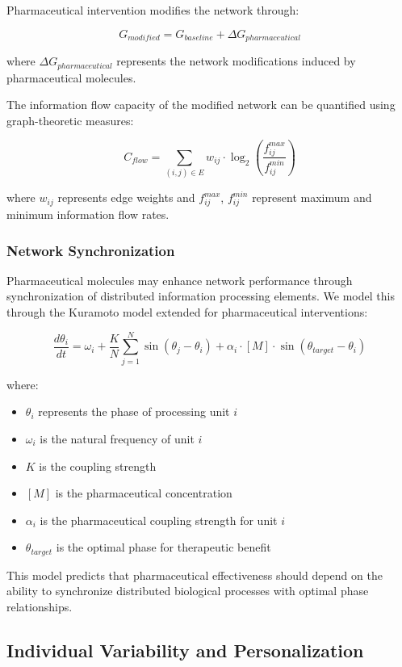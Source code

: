 \documentclass[12pt,a4paper]{article}
\begin{document}
Pharmaceutical intervention modifies the network through:

$$G_{modified} = G_{baseline} + \Delta G_{pharmaceutical}$$

where $\Delta G_{pharmaceutical}$ represents the network modifications induced by pharmaceutical molecules.

The information flow capacity of the modified network can be quantified using graph-theoretic measures:

$$C_{flow} = \sum_{(i,j) \in E} w_{ij} \cdot \log_2\left(\frac{f_{ij}^{max}}{f_{ij}^{min}}\right)$$

where $w_{ij}$ represents edge weights and $f_{ij}^{max}$, $f_{ij}^{min}$ represent maximum and minimum information flow rates.

\subsubsection{Network Synchronization}

Pharmaceutical molecules may enhance network performance through synchronization of distributed information processing elements. We model this through the Kuramoto model extended for pharmaceutical interventions:

$$\frac{d\theta_i}{dt} = \omega_i + \frac{K}{N} \sum_{j=1}^{N} \sin(\theta_j - \theta_i) + \alpha_i \cdot [M] \cdot \sin(\theta_{target} - \theta_i)$$

where:
\begin{itemize}
\item $\theta_i$ represents the phase of processing unit $i$
\item $\omega_i$ is the natural frequency of unit $i$
\item $K$ is the coupling strength
\item $[M]$ is the pharmaceutical concentration
\item $\alpha_i$ is the pharmaceutical coupling strength for unit $i$
\item $\theta_{target}$ is the optimal phase for therapeutic benefit
\end{itemize}

This model predicts that pharmaceutical effectiveness should depend on the ability to synchronize distributed biological processes with optimal phase relationships.

\subsection{Individual Variability and Personalization}
\end{document}
